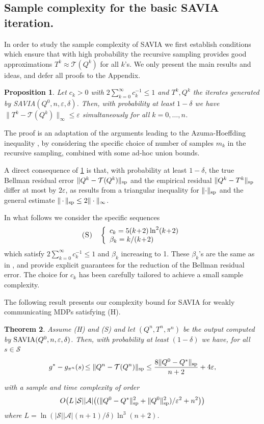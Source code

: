 \documentclass{article}
\newcommand{\cA}{\mathcal{A}}
\newcommand{\cS}{\mathcal{S}}
\newcommand{\T}{\mathcal{T}}
\renewcommand{\sp}[1]{\|{#1}\|_\text{\rm sp}}
\theoremstyle{plain}
\newtheorem{theorem}{Theorem}[section]
\newtheorem{proposition}[theorem]{Proposition}
\theoremstyle{definition}
\theoremstyle{remark}
\begin{document}
\subsection{Sample complexity for the basic {\rm SAVIA} iteration.}\label{Se:complexity1}
In order to study the sample complexity of \mbox{\rm SAVIA} we first establish conditions which ensure  that
 with high probability  the recursive sampling provides good approximations $T^k\approx \T(Q^k)$ for all $k$'s. We only present the main results and ideas, and defer all proofs to the Appendix.

\begin{proposition}\label{prop:sam-err0}
Let $c_k>0$  with \mbox{$2\sum_{k=0}^\infty c_k^{-1}\leq 1$} and $T^k, Q^k$ the iterates generated by \mbox{\rm SAVIA}$(Q^0,n,\varepsilon,\delta)$.
Then, with probability at least $1-\delta$ we have $\|T^k-\T(Q^k)\|_\infty\le  \varepsilon$ simultaneously for 
 all $k=0,\ldots,n$.
\end{proposition}
The proof is an adaptation of the arguments leading to the Azuma-Hoeffding inequality \citep{azuma1967weighted}, by considering the specific choice of number of samples $m_k$ in the recursive sampling, combined with some ad-hoc union bounds.


 A direct consequence of \cref{prop:sam-err0} is that, 
with probability at least $1-\delta$, the true Bellman residual error
$\sp{Q^k-\T(Q^k)}$ and the empirical residual $\sp{Q^k-T^k}$ differ at most by $2\varepsilon$, as results from a triangular inequality for $\sp{\cdot}$ and the general estimate $\sp{\,\cdot\,}\leq 2\|\cdot\|_\infty$.


In what follows we consider the  specific sequences 
\begin{equation*}
\mbox{\sc (S)}~~~\left\{\begin{array}{l}
c_k=5(k\!+\!2)\ln^2(k\!+\!2)\\
\beta_k=k/(k\!+\!2) 
\end{array}\right. 
\end{equation*}
which satisfy $2\sum_{k=0}^{\infty}c_k^{-1}\leq 1$
and $\beta_k$ increasing to 1. These $\beta_k$'s are the same as in \citet{sabach2017first}, and provide explicit guarantees for the reduction of the Bellman residual error. The choice for $c_k$ has been carefully tailored to achieve a small sample complexity.

The following result presents our complexity bound for \mbox{\rm SAVIA} for weakly communicating MDPs satisfying \mbox{\sc (H)}.
\begin{theorem}\label{thm:err}
Assume \mbox{\sc (H)} and \mbox{\sc (S)} and let $(Q^n,T^n,\pi^n)$ be the output computed by $\mbox{\rm SAVIA}(Q^0,n,\varepsilon,\delta)$. Then, with probability at least $(1-\delta)$ we have, for all $s \in \cS$
\vspace{-1ex}
$$ g^*-g_{\pi^n}(s)\! \leq \sp{Q^n-\T(Q^n)}\leq \frac{8\sp{Q^0-Q^*}}{n+2}+4\varepsilon,$$

\vspace{-2ex}
with a sample and time complexity of order $${O}\big(L\,|\cS||\cA|\big(({\sp{Q^0-Q^*}^{2}+\sp{Q^0}^{2}})/{\varepsilon^{2}}+n^2\big)\big)$$ 
where  
$L=\ln(|\cS||\cA|(n+1)/\delta)\ln^3(n+2)$.
\end{theorem}
\end{document}
